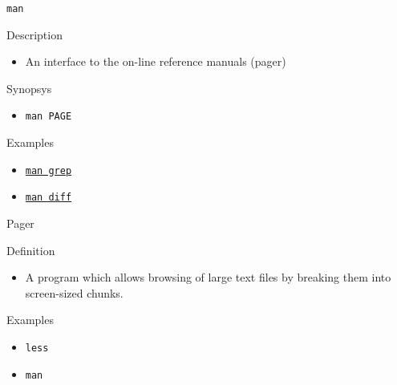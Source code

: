 \documentclass[table,dvipsnames]{beamer}
\begin{document}
\begin{frame}[fragile]{\texttt{man}}
	\begin{block}{Description}
		\begin{itemize}
			\item An interface to the on-line reference manuals (pager) 
		\end{itemize}
	\end{block}
	\begin{block}{Synopsys}
		\begin{itemize}
			\item \texttt{man PAGE}
		\end{itemize}
	\end{block}
	\begin{block}{Examples}
		\begin{itemize}
			\item \href{http://www.gnu.org/software/grep/manual/grep.html}{\texttt{man grep}}
			\item
				\href{http://www.gnu.org/software/diffutils/manual/diffutils.html}{\texttt{man
				diff}}
		\end{itemize}
	\end{block}
\end{frame}

\begin{frame}{Pager}
	\begin{block}{Definition}
		\begin{itemize}
			\item A program which allows browsing of large text files by
				breaking them into screen-sized chunks. 
		\end{itemize}
	\end{block}
	\begin{block}{Examples}
		\begin{itemize}
			\item \texttt{less}
			\item \texttt{man}
		\end{itemize}
	\end{block}
\end{frame}
\end{document}
